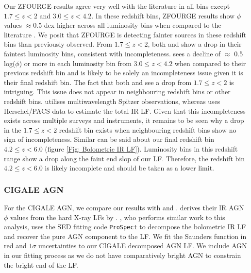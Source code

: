 Our ZFOURGE results agree very well with the literature in all bins except $1.7 \leq z < 2$ and $3.0 \leq z < 4.2$. In these redshift bins, ZFOURGE results show $\phi$ values $\approx 0.5$ dex higher across all luminosity bins when compared to the literature \citep{gruppioni_herschel_2013, rodighiero_mid-_2010}. We posit that ZFOURGE is detecting fainter sources in these redshift bins than previously observed. From $1.7 \leq z < 2$, both \cite{rodighiero_mid-_2010} and \cite{gruppioni_herschel_2013} show a drop in their faintest luminosity bins, consistent with incompleteness. \cite{gruppioni_herschel_2013} sees a decline of $\approx$ 0.5 log($\phi$) or more in each luminosity bin from $3.0 \leq z < 4.2$ when compared to their previous redshift bin and is likely to be solely an incompleteness issue given it is their final redshift bin. The fact that both \cite{gruppioni_herschel_2013} and \cite{rodighiero_mid-_2010} see a drop from $1.7 \leq z < 2$ is intriguing. This issue does not appear in neighbouring redshift bins or other redshift bins. \cite{rodighiero_mid-_2010} utilises multiwavelength Spitzer observations, whereas \cite{gruppioni_herschel_2013} uses Herschel/PACS data to estimate the total IR LF. Given that this incompleteness exists across multiple surveys and instruments, it remains to be seen why a drop in the $1.7 \leq z < 2$ redshift bin exists when neighbouring redshift bins show no sign of incompleteness. Similar can be said about our final redshift bin $4.2 \leq z < 6.0$ (figure \ref{Fig: Bolometric IR LF}). Luminosity bins in this redshift range show a drop along the faint end slop of our LF. Therefore, the redshift bin $4.2 \leq z < 6.0$ is likely incomplete and should be taken as a lower limit.

\subsubsection{CIGALE AGN}
For the CIGALE AGN, we compare our results with \cite{symeonidis_agn_2021} and \cite{thorne_deep_2022}. \cite{symeonidis_agn_2021} derives their IR AGN $\phi$ values from the hard X-ray LFs by \cite{aird_evolution_2015}. \cite{thorne_deep_2022}, who performs similar work to this analysis, uses the SED fitting code \texttt{ProSpect} \citep{leja_deriving_2017, robotham_prospect_2020} to decompose the bolometric IR LF and recover the pure AGN component to the LF. We fit the Saunders function in red and $1\sigma$ uncertainties to our CIGALE decomposed AGN LF. We include \cite{thorne_deep_2022} AGN in our fitting process as we do not have comparatively bright AGN to constrain the bright end of the LF. 


